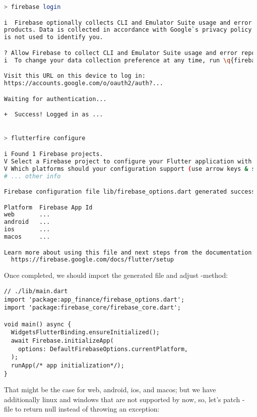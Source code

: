 \begin{lstlisting}[language=bash]
> firebase login

i  Firebase optionally collects CLI and Emulator Suite usage and error reporting information to help improve our 
products. Data is collected in accordance with Google`s privacy policy (https://policies.google.com/privacy) and 
is not used to identify you.

? Allow Firebase to collect CLI and Emulator Suite usage and error reporting information? Yes
i  To change your data collection preference at any time, run \q{firebase logout} and log in again.

Visit this URL on this device to log in:
https://accounts.google.com/o/oauth2/auth?...

Waiting for authentication...

+  Success! Logged in as ...


> flutterfire configure

i Found 1 Firebase projects.
V Select a Firebase project to configure your Flutter application with  fingrom-9030a (Fingrom)
V Which platforms should your configuration support (use arrow keys & space to select)? - macos, web, ios, android
# ... other info

Firebase configuration file lib/firebase_options.dart generated successfully with the following Firebase apps:

Platform  Firebase App Id
web       ...
android   ...
ios       ...
macos     ...

Learn more about using this file and next steps from the documentation:
  https://firebase.google.com/docs/flutter/setup
\end{lstlisting}

\noindent Once completed, we should import the generated file and adjust -method:

\begin{lstlisting}
// ./lib/main.dart
import 'package:app_finance/firebase_options.dart';
import 'package:firebase_core/firebase_core.dart';

void main() async {
  WidgetsFlutterBinding.ensureInitialized();
  await Firebase.initializeApp(
    options: DefaultFirebaseOptions.currentPlatform,
  );
  runApp(/* app initialization*/);
}
\end{lstlisting}

\noindent That might be the case for web, android, ios, and macos; but we have additionally linux and windows that are 
not supported by now, so, let's patch -file to return null instead of throwing an exception:

